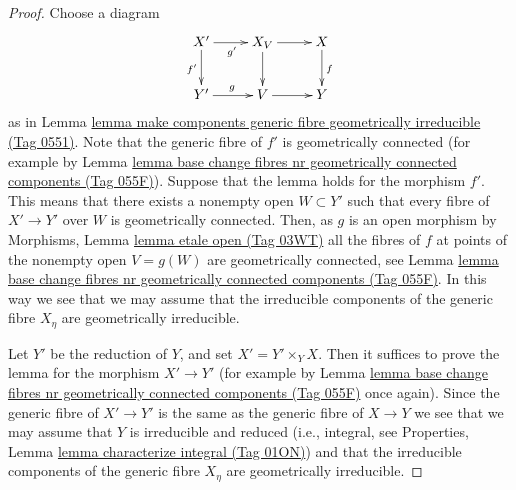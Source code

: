 \documentclass{amsart}
\theoremstyle{plain}
\theoremstyle{definition}
\theoremstyle{remark}
\numberwithin{equation}{subsection}
\begin{document}
\begin{proof}
Choose a diagram
$$
\xymatrix{
X' \ar[d]_{f'} \ar[r]_{g'} & X_V \ar[r] \ar[d] & X \ar[d]^f \\
Y' \ar[r]^g & V \ar[r] & Y
}
$$
as in
Lemma \href{https://stacks.math.columbia.edu/tag/0551}{lemma make components generic fibre geometrically irreducible (Tag 0551)}.
Note that the generic fibre of $f'$ is geometrically connected
(for example by
Lemma \href{https://stacks.math.columbia.edu/tag/055F}{lemma base change fibres nr geometrically connected components (Tag 055F)}).
Suppose that the lemma holds for the morphism $f'$. This means that
there exists a nonempty open $W \subset Y'$ such that every fibre of
$X' \to Y'$ over $W$ is geometrically connected.
Then, as $g$ is an open morphism by
Morphisms, Lemma \href{https://stacks.math.columbia.edu/tag/03WT}{lemma etale open (Tag 03WT)}
all the fibres of $f$ at points of the nonempty open $V = g(W)$ are
geometrically connected, see
Lemma \href{https://stacks.math.columbia.edu/tag/055F}{lemma base change fibres nr geometrically connected components (Tag 055F)}.
In this way we see that we may assume that the irreducible
components of the generic fibre $X_\eta$ are geometrically irreducible.

\medskip\noindent
Let $Y'$ be the reduction of $Y$, and set $X' = Y' \times_Y X$.
Then it suffices to prove the lemma for the morphism $X' \to Y'$
(for example by
Lemma \href{https://stacks.math.columbia.edu/tag/055F}{lemma base change fibres nr geometrically connected components (Tag 055F)}
once again). Since the generic fibre of $X' \to Y'$ is the same as the
generic fibre of $X \to Y$ we see that we may assume that $Y$ is
irreducible and reduced (i.e., integral, see
Properties, Lemma \href{https://stacks.math.columbia.edu/tag/01ON}{lemma characterize integral (Tag 01ON)})
and that the irreducible
components of the generic fibre $X_\eta$ are geometrically irreducible.


\end{proof}
\end{document}
